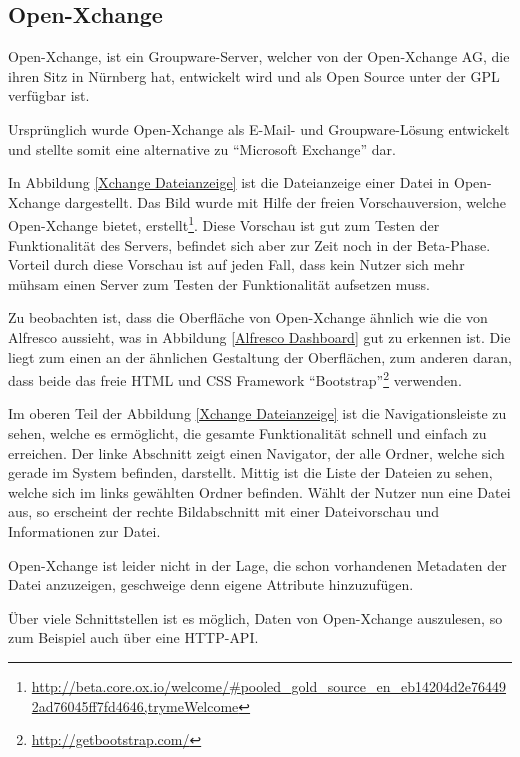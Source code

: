 \subsection{Open-Xchange} \label{Open Xchange}
Open-Xchange, ist ein Groupware-Server, welcher von der Open-Xchange AG, die ihren Sitz in N\"urnberg hat, entwickelt wird und als Open Source unter der \ac{GPL} verf\"ugbar ist. \cite{Xchange_Seite} \cite{Xchange_Golem}

Urspr\"unglich wurde Open-Xchange als E-Mail- und Groupware-L\"osung entwickelt und stellte somit eine alternative zu "`Microsoft Exchange"' dar. \cite{Wiki_Xchange}

In Abbildung \ref{Xchange Dateianzeige} ist die Dateianzeige einer Datei in Open-Xchange dargestellt. Das Bild wurde mit Hilfe der freien Vorschauversion, welche Open-Xchange bietet, erstellt\footnote{\url{http://beta.core.ox.io/welcome/\#pooled\_gold\_source\_en\_eb14204d2e764492ad76045ff7fd4646,trymeWelcome}}. Diese Vorschau ist gut zum Testen der Funktionalit\"at des Servers, befindet sich aber zur Zeit noch in der Beta-Phase. Vorteil durch diese Vorschau ist auf jeden Fall, dass kein Nutzer sich mehr m\"uhsam einen Server zum Testen der Funktionalit\"at aufsetzen muss.

Zu beobachten ist, dass die Oberfl\"ache von Open-Xchange \"ahnlich wie die von Alfresco aussieht, was in Abbildung \ref{Alfresco Dashboard} gut zu erkennen ist. Die liegt zum einen an der \"ahnlichen Gestaltung der Oberfl\"achen, zum anderen daran, dass beide das freie HTML und CSS Framework "`Bootstrap"'\footnote{\url{http://getbootstrap.com/}} verwenden.

Im oberen Teil der Abbildung \ref{Xchange Dateianzeige} ist die Navigationsleiste zu sehen, welche es erm\"oglicht, die gesamte Funktionalit\"at schnell und einfach zu erreichen. Der linke Abschnitt zeigt einen Navigator, der alle Ordner, welche sich gerade im System befinden, darstellt. Mittig ist die Liste der Dateien zu sehen, welche sich im links gew\"ahlten Ordner befinden. W\"ahlt der Nutzer nun eine Datei aus, so erscheint der rechte Bildabschnitt mit einer Dateivorschau und Informationen zur Datei.

Open-Xchange ist leider nicht in der Lage, die schon vorhandenen Metadaten der Datei anzuzeigen, geschweige denn eigene Attribute hinzuzuf\"ugen.

\"Uber viele Schnittstellen ist es m\"oglich, Daten von Open-Xchange auszulesen, so zum Beispiel auch \"uber eine HTTP-\ac{API}. \cite{Oxpedia_HTTP_API}

